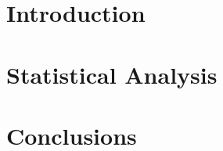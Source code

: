 \documentclass[11pt]{article}
\begin{document}
\section{Introduction}

\section{Statistical Analysis}

\section{Conclusions}


\end{document}
